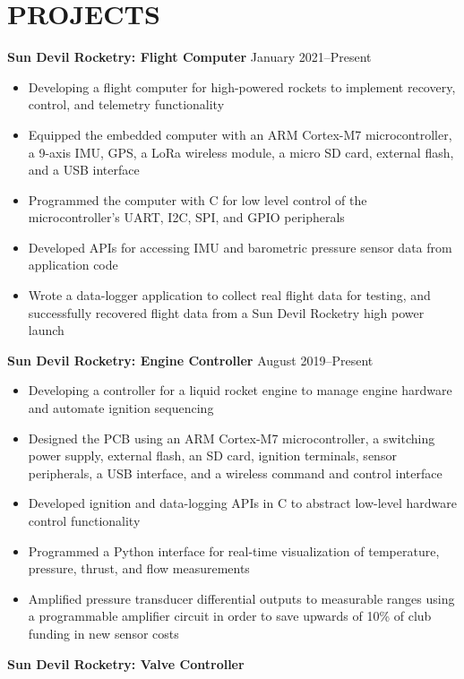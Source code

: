 \documentclass{article}
\begin{document}
\section{PROJECTS}
\textbf{Sun Devil Rocketry: Flight Computer}
\hfill
\vspace{0.5em}
January 2021--Present
\begin{itemize}
\item{Developing a flight computer for high-powered rockets to implement recovery, control, and telemetry functionality}
\item{Equipped the embedded computer with an ARM Cortex-M7 microcontroller, a 9-axis IMU, GPS, a LoRa wireless module, a micro SD card, external flash, and a USB interface}
\item{Programmed the computer with C for low level control of the microcontroller's UART, I2C, SPI, and GPIO peripherals}
\item{Developed APIs for accessing IMU and barometric pressure sensor data from application code}
\item{Wrote a data-logger application to collect real flight data for testing, and successfully recovered flight data from a Sun Devil Rocketry high power launch}
\end{itemize}
\vspace{1em}
\textbf{Sun Devil Rocketry: Engine Controller}
\hfill
\vspace{0.5em}
August 2019--Present
\begin{itemize}
\item{Developing a controller for a liquid rocket engine to manage engine hardware and automate ignition sequencing}
\item{Designed the PCB using an ARM Cortex-M7 microcontroller, a switching power supply, external flash, an SD card, ignition terminals, sensor peripherals, a USB interface, and a wireless command and control interface}
\item{Developed ignition and data-logging APIs in C to abstract low-level hardware control functionality}
\item{Programmed a Python interface for real-time visualization of temperature, pressure, thrust, and flow measurements}
\item{Amplified pressure transducer differential outputs to measurable ranges using a programmable amplifier circuit in order to save upwards of 10\% of club funding in new sensor costs}
\end{itemize}
\vspace{1em}
\textbf{Sun Devil Rocketry: Valve Controller}
\end{document}
